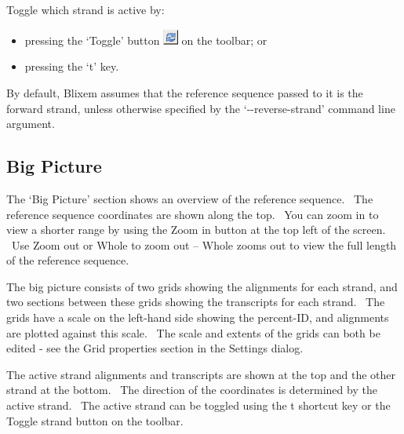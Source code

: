 \documentclass[letterpaper]{article}
\newcommand\liststyleWWviiiNumxxxvi{%
\renewcommand\labelitemi{{\textbullet}}
\renewcommand\labelitemii{o}
\renewcommand\labelitemiii{[F0A7?]}
\renewcommand\labelitemiv{[F0B7?]}
}
\begin{document}
\bigskip

{Toggle which strand is active by:}

\liststyleWWviiiNumxxxvi
\begin{itemize}
\item {
pressing the {\textquoteleft}Toggle{\textquoteright} button 
\includegraphics[width=0.496cm,height=0.533cm]{img_button_toggle_strand.png} 
on the toolbar; or}
\item {
pressing the {\textquoteleft}t{\textquoteright} key.}
\end{itemize}

\bigskip

{By default, Blixem assumes that the reference sequence passed to it is
the forward strand, unless otherwise specified by the
{\textquoteleft}-{}-reverse-strand{\textquoteright} command line
argument.}

{\color[rgb]{0.30980393,0.5058824,0.7411765}\subsection[Big Picture]{Big Picture}}
\hypertarget{RefHeading1641056909880}{}{
The {\textquoteleft}Big Picture{\textquoteright} section shows an
overview of the reference sequence. \ The reference sequence
coordinates are shown along the top. \ You can zoom in to view a
shorter range by using the {\textquotesingle}Zoom in{\textquotesingle}
button at the top left of the screen. \ Use {\textquotesingle}Zoom
out{\textquotesingle} or {\textquotesingle}Whole{\textquotesingle} to
zoom out -- {\textquotesingle}Whole{\textquotesingle} zooms out to view
the full length of the reference sequence.}

\bigskip

{The big picture consists of two grids showing the alignments for each
strand, and two sections between these grids showing the transcripts
for each strand. \ The grids have a scale on the left-hand side showing
the percent-ID, and alignments are plotted against this scale. \ The
scale and extents of the grids can both be edited - see the Grid
properties section in the Settings dialog.}


\bigskip

{
The active strand alignments and transcripts are shown at the top and
the other strand at the bottom. \ The direction of the coordinates is
determined by the active strand. \ The active strand can be toggled
using the {\textquotesingle}t{\textquotesingle} shortcut key or the
{\textquotesingle}Toggle strand{\textquotesingle} button on the
toolbar.}
\end{document}
